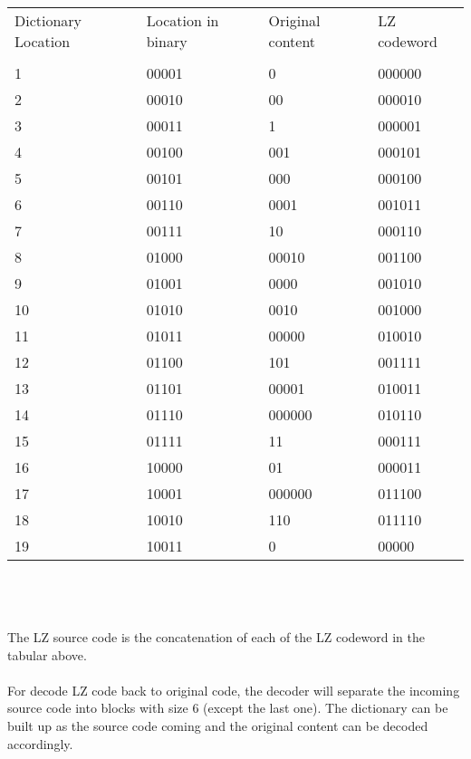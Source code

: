 \documentclass [12pt] {article}
\begin{document}
~\\
~\\
\begin{tabular}{l l l l}
  Dictionary Location& Location in binary & Original content &  LZ codeword\\
  \\
  1 & 00001 & 0 & 000000\\
  2 & 00010 & 00 & 000010\\
  3 & 00011 & 1 & 000001\\
  4 & 00100 & 001 & 000101\\
  5 & 00101 & 000& 000100\\
  6 & 00110 & 0001 & 001011\\
  7 & 00111 & 10 & 000110\\
  8 & 01000 & 00010 & 001100\\
  9 & 01001 & 0000 & 001010\\
  10 & 01010 & 0010 & 001000\\
  11 & 01011 & 00000 & 010010\\
  12 & 01100 & 101 & 001111\\
  13 & 01101 & 00001 & 010011\\
  14 & 01110 & 000000 & 010110\\
  15 & 01111 & 11 & 000111\\
  16& 10000 & 01 & 000011\\
  17 & 10001 & 000000 & 011100\\
  18 & 10010 & 110 & 011110\\
  19 & 10011 & 0 & 00000\\
\end{tabular}
~\\
~\\
~\\
The LZ source code is the concatenation of each of the LZ codeword in the tabular above. \\
~\\
For decode LZ code back to original code, the decoder will separate the incoming source code into blocks with size 6 (except the last one). The dictionary can be built up as the source code coming and the original content can be decoded accordingly.\\
\end{document}
